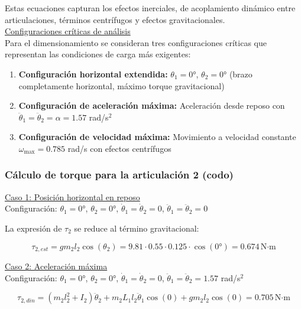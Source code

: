Estas ecuaciones capturan los efectos inerciales, de acoplamiento dinámico entre articulaciones, términos centrífugos y efectos gravitacionales. \\

\underline{Configuraciones críticas de análisis}\\

Para el dimensionamiento se consideran tres configuraciones críticas que representan las condiciones de carga más exigentes:

\begin{enumerate}
    \item \textbf{Configuración horizontal extendida:} $\theta_1 = 0°$, $\theta_2 = 0°$ (brazo completamente horizontal, máximo torque gravitacional)
    \item \textbf{Configuración de aceleración máxima:} Aceleración desde reposo con $\ddot{\theta}_1 = \ddot{\theta}_2 = \alpha = 1.57$ rad/s$^2$
    \item \textbf{Configuración de velocidad máxima:} Movimiento a velocidad constante $\omega_{\max} = 0.785$ rad/s con efectos centrífugos
\end{enumerate}

\subsubsection{Cálculo de torque para la articulación 2 (codo)}

\underline{Caso 1: Posición horizontal en reposo} \\

Configuración: $\theta_1 = 0°$, $\theta_2 = 0°$, $\dot{\theta}_1 = \dot{\theta}_2 = 0$, $\ddot{\theta}_1 = \ddot{\theta}_2 = 0$

La expresión de $\tau_2$ se reduce al término gravitacional:

\begin{equation}
\tau_{2,est} = gm_2l_2\cos(\theta_2) = 9.81 \cdot 0.55 \cdot 0.125 \cdot \cos(0°) = 0.674 \, \text{N·m}
\end{equation}

\underline{Caso 2: Aceleración máxima}\\

Configuración: $\theta_1 = 0°$, $\theta_2 = 0°$, $\dot{\theta}_1 = \dot{\theta}_2 = 0$, $\ddot{\theta}_1 = \ddot{\theta}_2 = 1.57$ rad/s$^2$

\begin{equation}
\tau_{2,din} = (m_2l_2^2 + I_2)\ddot{\theta}_2 + m_2L_1l_2\ddot{\theta}_1\cos(0) + gm_2l_2\cos(0)
= 0.705 \, \text{N·m}
\end{equation}

